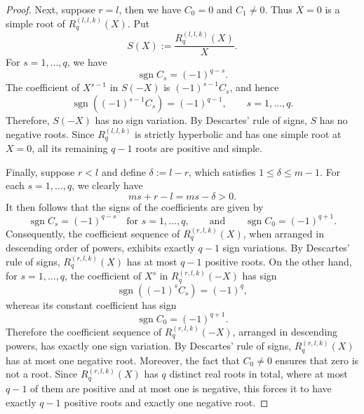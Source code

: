 \documentclass[preprint,3p,10pt]{elsarticle}
\theoremstyle{definition}
\begin{document}
\begin{proof}
Next, suppose \(r=l\), then we have $C_0=0$ and $C_1 \neq0$.
Thus \(X=0\) is a simple root of \(R_q^{(l,l,k)}(X)\). Put
\begin{equation}
    S(X):=\frac{R_q^{(l,l,k)}(X)}{X}.
\end{equation}
For \(s=1,\ldots,q\), we have
\begin{equation}
    \operatorname{sgn}C_s=(-1)^{q-s}.
\end{equation}
The coefficient of \(X^{s-1}\) in \(S(-X)\) is \((-1)^{s-1}C_s\), and hence
\begin{equation}
    \operatorname{sgn}\left((-1)^{s-1}C_s\right)=(-1)^{q-1},
    \qquad s=1,\ldots,q.
\end{equation}
Therefore, \(S(-X)\) has no sign variation. By Descartes' rule of signs,
\(S\) has no negative roots. Since \(R_q^{(l,l,k)}\) is strictly hyperbolic and
has one simple root at \(X=0\), all its remaining \(q-1\) roots are positive and
simple.


Finally, suppose $r < l$ and define $\delta := l - r$, which satisfies $1 \le \delta \le m - 1$. For each $s = 1, \ldots, q$, we clearly have
\begin{equation}
    ms + r - l = ms - \delta > 0.
\end{equation}
It then follows that the signs of the coefficients are given by
\begin{equation}
    \operatorname{sgn}C_s = (-1)^{q-s} \quad \text{for } s = 1, \ldots, q, \qquad \text{and} \qquad \operatorname{sgn}C_0 = (-1)^{q+1}.
\end{equation}
Consequently, the coefficient sequence of $R_q^{(r,l,k)}(X)$, when arranged in descending order of powers, exhibits exactly $q-1$ sign variations. By Descartes' rule of signs, $R_q^{(r,l,k)}(X)$ has at most $q-1$ positive roots.
On the other hand, for \(s=1,\ldots,q\), the coefficient of \(X^s\) in
\(R_q^{(r,l,k)}(-X)\) has sign
\begin{equation}
    \operatorname{sgn}\left((-1)^sC_s\right)=(-1)^q,
\end{equation}
whereas its constant coefficient has sign
\begin{equation}
    \operatorname{sgn}C_0=(-1)^{q+1}.
\end{equation}
Therefore the coefficient sequence of \(R_q^{(r,l,k)}(-X)\), arranged in
descending powers, has exactly one sign variation. By Descartes' rule of signs,
\(R_q^{(r,l,k)}(X)\) has at most one negative root.
Moreover, the fact that $C_0 \neq 0$ ensures that zero is not a root. Since $R_q^{(r,l,k)}(X)$ has $q$ distinct real roots in total, where at most $q-1$ of them are positive and at most one is negative, this forces it to have exactly $q-1$ positive roots and exactly one negative root.


\end{proof}
\end{document}
